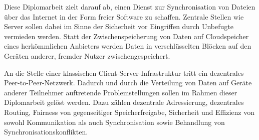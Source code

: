 Diese Diplomarbeit zielt darauf ab, einen Dienst zur Synchronisation von Dateien über das Internet in der Form freier Software zu schaffen.
Zentrale Stellen wie Server sollen dabei im Sinne der Sicherheit vor Eingriffen durch Unbefugte vermieden werden.
Statt der Zwischenspeicherung von Daten auf Cloudspeicher eines herkömmlichen Anbieters werden Daten in verschlüsselten Blöcken auf den Geräten anderer, fremder Nutzer zwischengespeichert.

An die Stelle einer klassischen Client-Server-Infrastruktur tritt ein dezentrales Peer-to-Peer-Netzwerk.
Dadurch und durch die Verteilung von Daten auf Geräte anderer Teilnehmer auftretende Problemstellungen sollen im Rahmen dieser Diplomarbeit gelöst werden.
Dazu zählen dezentrale Adressierung, dezentrales Routing, Fairness von gegenseitiger Speicherfreigabe, Sicherheit und Effizienz von sowohl Kommunikation als auch Synchronisation sowie Behandlung von Synchronisationskonflikten.

